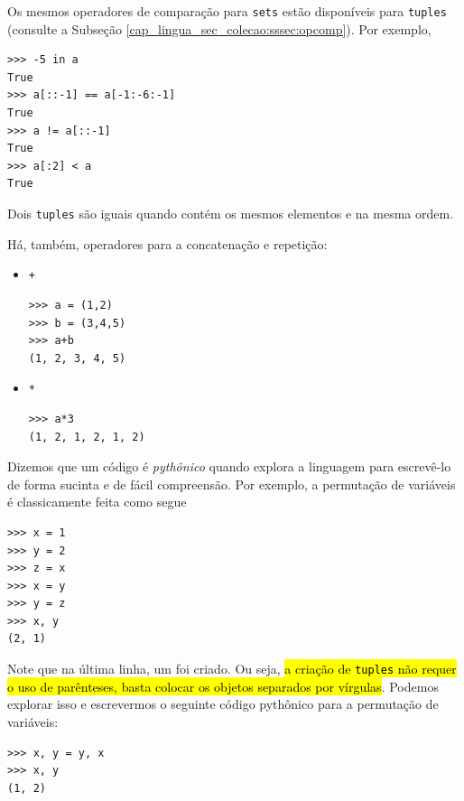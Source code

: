 Os mesmos operadores de comparação para \texttt{sets} estão disponíveis para \texttt{tuples} (consulte a Subseção \ref{cap_lingua_sec_colecao:sssec:opcomp}). Por exemplo,

\begin{lstlisting}
>>> -5 in a
True
>>> a[::-1] == a[-1:-6:-1]
True
>>> a != a[::-1]
True
>>> a[:2] < a
True
\end{lstlisting}

\ifisbook
\vspace{0.2cm}
\fi

\begin{obs}
  Dois \texttt{tuples} são iguais quando contém os mesmos elementos e na mesma ordem.
\end{obs}

\ifisbook
\vspace{0.2cm}
\fi

Há, também, operadores para a concatenação e repetição:
\begin{itemize}
\item \lstinline!+! 

\begin{lstlisting}[xrightmargin=2.5em]
>>> a = (1,2)
>>> b = (3,4,5)
>>> a+b
(1, 2, 3, 4, 5)
\end{lstlisting}

\item \lstinline!*! 

\begin{lstlisting}[xrightmargin=2.5em]
>>> a*3
(1, 2, 1, 2, 1, 2)
\end{lstlisting}
\end{itemize}

\begin{obs}
  Dizemos que um código é \emph{pythônico} quando explora a linguagem para escrevê-lo de forma sucinta e de fácil compreensão. Por exemplo, a permutação de variáveis é classicamente feita como segue

\begin{lstlisting}
>>> x = 1
>>> y = 2
>>> z = x
>>> x = y
>>> y = z
>>> x, y
(2, 1)
\end{lstlisting}

Note que na última linha, um {\PYTHONtuple} foi criado. Ou seja, \hl{a criação de \texttt{tuples} não requer o uso de parênteses, basta colocar os objetos separados por vírgulas}. Podemos explorar isso e escrevermos o seguinte código pythônico para a permutação de variáveis:

\begin{lstlisting}
>>> x, y = y, x
>>> x, y
(1, 2)
\end{lstlisting}

\end{obs}

